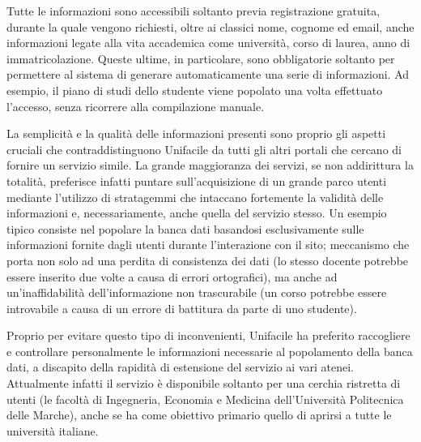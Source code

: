 	Tutte le informazioni sono accessibili soltanto previa registrazione gratuita, durante la quale vengono richiesti, oltre ai classici nome, cognome ed email, anche informazioni legate alla vita accademica come università, corso di laurea, anno di immatricolazione. Queste ultime, in particolare, sono obbligatorie soltanto per permettere al sistema di generare automaticamente una serie di informazioni. Ad esempio, il piano di studi dello studente viene popolato una volta effettuato l’accesso, senza ricorrere alla compilazione manuale.

	La semplicità e la qualità delle informazioni presenti sono proprio gli aspetti cruciali che contraddistinguono Unifacile da tutti gli altri portali che cercano di fornire un servizio simile. 
	La grande maggioranza dei servizi, se non addirittura la totalità, preferisce infatti puntare sull’acquisizione di un grande parco utenti mediante l’utilizzo di stratagemmi che intaccano fortemente la validità delle informazioni e, necessariamente, anche quella del servizio stesso.
	Un esempio tipico consiste nel popolare la banca dati basandosi esclusivamente sulle informazioni fornite dagli utenti durante l’interazione con il sito; meccanismo che porta non solo ad una perdita di consistenza dei dati (lo stesso docente potrebbe essere inserito due volte a causa di errori ortografici), ma anche ad un'inaffidabilità dell’informazione non trascurabile (un corso potrebbe essere introvabile a causa di un errore di battitura da parte di uno studente).

	Proprio per evitare questo tipo di inconvenienti, Unifacile ha preferito raccogliere e controllare personalmente le informazioni necessarie al popolamento della banca dati, a discapito della rapidità di estensione del servizio ai vari atenei.
	Attualmente infatti il servizio è disponibile soltanto per una cerchia ristretta di utenti (le facoltà di Ingegneria, Economia e Medicina dell'Università Politecnica delle Marche), anche se ha come obiettivo primario quello di aprirsi a tutte le università italiane.
